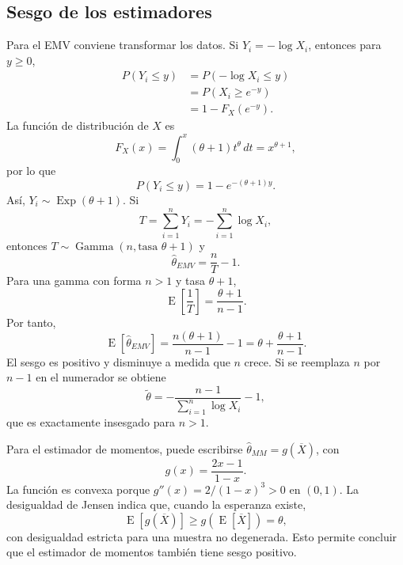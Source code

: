 \documentclass[10pt,a4paper,oneside]{article}
\newcommand{\E}{\operatorname{E}}
\begin{document}
\subsection*{Sesgo de los estimadores}

Para el EMV conviene transformar los datos. Si $Y_i=-\log X_i$, entonces para $y\geq0$,
\begin{align*}
P(Y_i\leq y)
&=P(-\log X_i\leq y)\\
&=P(X_i\geq e^{-y})\\
&=1-F_X(e^{-y}).
\end{align*}
La función de distribución de $X$ es
\begin{equation*}
F_X(x)=\int_0^x(\theta+1)t^\theta\,dt=x^{\theta+1},
\end{equation*}
por lo que
\begin{equation*}
P(Y_i\leq y)=1-e^{-(\theta+1)y}.
\end{equation*}
Así, $Y_i\sim\operatorname{Exp}(\theta+1)$. Si
\begin{equation*}
T=\sum_{i=1}^{n}Y_i=-\sum_{i=1}^{n}\log X_i,
\end{equation*}
entonces $T\sim\operatorname{Gamma}(n,\text{tasa }\theta+1)$ y
\begin{equation*}
\widehat\theta_{EMV}=\frac{n}{T}-1.
\end{equation*}
Para una gamma con forma $n>1$ y tasa $\theta+1$,
\begin{equation*}
\E\!\left[\frac1T\right]=\frac{\theta+1}{n-1}.
\end{equation*}
Por tanto,
\begin{equation*}
\E[\widehat\theta_{EMV}]
=\frac{n(\theta+1)}{n-1}-1
=\theta+\frac{\theta+1}{n-1}.
\end{equation*}
El sesgo es positivo y disminuye a medida que $n$ crece. Si se reemplaza $n$ por $n-1$ en el numerador se obtiene
\begin{equation}
\boxed{
\widetilde\theta=-\frac{n-1}{\sum_{i=1}^{n}\log X_i}-1,}
\label{eq:emv-corrected}
\end{equation}
que es exactamente insesgado para $n>1$.

Para el estimador de momentos, puede escribirse $\widehat\theta_{MM}=g(\overline X)$, con
\begin{equation*}
g(x)=\frac{2x-1}{1-x}.
\end{equation*}
La función es convexa porque $g''(x)=2/(1-x)^3>0$ en $(0,1)$. La desigualdad de Jensen indica que, cuando la esperanza existe,
\begin{equation*}
\E[g(\overline X)]\geq g(\E[\overline X])=\theta,
\end{equation*}
con desigualdad estricta para una muestra no degenerada. Esto permite concluir que el estimador de momentos también tiene sesgo positivo.
\end{document}
